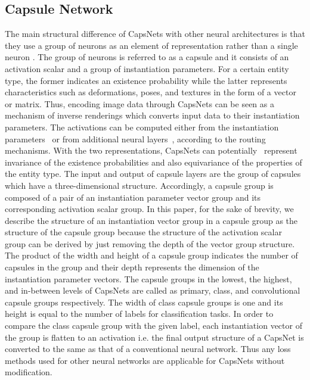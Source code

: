 \documentclass[review]{elsarticle}
\begin{document}
\subsection{Capsule Network}
The main structural difference of CapsNets with other neural architectures is that they use a group of neurons as an element of representation rather than a single neuron \citep{DBLP:conf/icann/HintonKW11}.
The group of neurons is referred to as a capsule and it consists of an activation scalar and a group of instantiation parameters.
For a certain entity type, the former indicates an existence probability while the latter represents characteristics such as deformations, poses, and textures in the form of a vector or matrix.
Thus, encoding image data through CapsNets can be seen as a mechanism of inverse renderings which converts input data to their instantiation parameters.
The activations can be computed either from the instantiation parameters~\citep{DBLP:conf/nips/SabourFH17} or from additional neural layers~\citep{DBLP:conf/iclr/HintonSF18}, according to the routing mechanisms.
With the two representations, CapsNets can potentially~\citep{NIPS2018_8100} represent invariance of the existence probabilities and also equivariance of the properties of the entity type.
The input and output of capsule layers are the group of capsules which have a three-dimensional structure.
Accordingly, a capsule group is composed of a pair of an instantiation parameter vector group and its corresponding activation scalar group.
In this paper, for the sake of brevity, we describe the structure of an instantiation vector group in a capsule group as the structure of the capsule group because the structure of the activation scalar group can be derived by just removing the depth of the vector group structure.
The product of the width and height of a capsule group indicates the number of capsules in the group and their depth represents the dimension of the instantiation parameter vectors.
The capsule groups in the lowest, the highest, and in-between levels of CapsNets are called as primary, class, and convolutional capsule groups respectively.
The width of class capsule groups is one and its height is equal to the number of labels for classification tasks.
In order to compare the class capsule group with the given label, each instantiation vector of the group is flatten to an activation i.e. the final output structure of a CapsNet is converted to the same as that of a conventional neural network.
Thus any loss methods used for other neural networks are applicable for CapsNets without modification.
\end{document}
